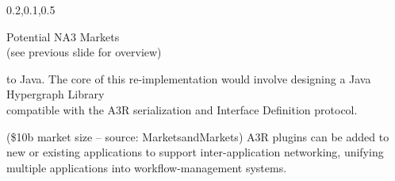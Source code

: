 \begin{frame}{}
{\begin{center}
\begin{minipage}{\textwidth}
{\begin{minipage}{\textwidth}
\begin{lightquadblockc}{0.2,0.1,0.5}{\parbox{21cm}{\vspace*{10pt}\centering Potential NA3 Markets \\(see previous slide for overview)\vspace*{10pt}}}
\begin{minipage}{1.1\textwidth}
{\begin{description}
to Java.  The core of this re-implementation would 
involve designing a Java Hypergraph Library \\compatible 
with the A3R serialization and Interface Definition 
protocol.\vspace{10pt}
\item[Workflow Management] 
({\texttildelow}\$10b market size -- 
source: 
{\selectfont MarketsandMarkets}) 
A3R plugins can be added to new or existing 
applications to support inter-application 
networking, unifying multiple applications into workflow-management systems.
\vspace{.75em}  
\end{description}}\end{minipage}
\end{lightquadblockc}
\end{minipage}}


\end{minipage}
\end{center}
}

\end{frame}
